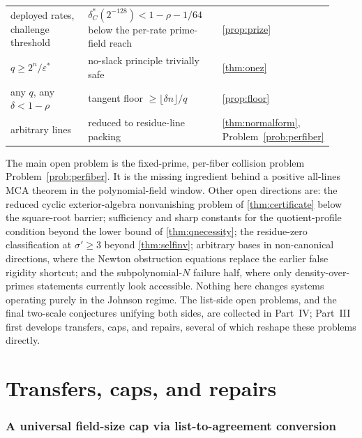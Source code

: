 \documentclass[11pt]{article}
\theoremstyle{definition}
\newcommand{\eps}{\varepsilon}
\begin{document}
\begin{table}[ht]
\begin{tabular}{p{0.29\linewidth}p{0.43\linewidth}p{0.20\linewidth}}
deployed rates, challenge threshold & $\delta_C^*(2^{-128})<1-\rho-1/64$ below the per-rate prime-field reach & \cref{prop:prize}\\
$q\ge2^n/\eps^*$ & no-slack principle trivially safe & \cref{thm:onez}\\
any $q$, any $\delta<1-\rho$ & tangent floor $\ge\lfloor\delta n\rfloor/q$ & \cref{prop:floor}\\
arbitrary lines & reduced to residue-line packing & \cref{thm:normalform}, Problem~\ref{prob:perfiber}\\
\bottomrule
\end{tabular}
\end{table}

The main open problem is the fixed-prime, per-fiber collision problem Problem~\ref{prob:perfiber}.  It is the missing ingredient behind a positive all-lines MCA theorem in the polynomial-field window.  Other open directions are: the reduced cyclic exterior-algebra nonvanishing problem of \cref{thm:certificate} below the square-root barrier; sufficiency and sharp constants for the quotient-profile condition beyond the lower bound of \cref{thm:qnecessity}; the residue-zero classification at $\sigma'\ge3$ beyond \cref{thm:selfinv}; arbitrary bases in non-canonical directions, where the Newton obstruction equations replace the earlier false rigidity shortcut; and the subpolynomial-$N$ failure half, where only density-over-primes statements currently look accessible.  Nothing here changes systems operating purely in the Johnson regime.  The list-side open problems, and the final two-scale conjectures unifying both sides, are collected in Part~IV; Part~III first develops transfers, caps, and repairs, several of which reshape these problems directly.

\part{Transfers, caps, and repairs}

\section{A universal field-size cap via list-to-agreement conversion}\label{sec:cap}
\end{document}
